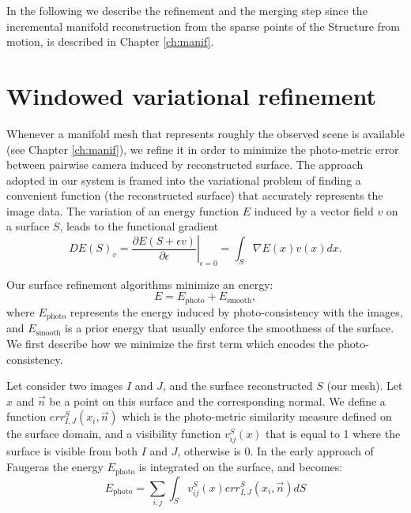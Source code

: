 In the following we describe the refinement and the merging step since the incremental manifold reconstruction from the sparse points of the Structure from motion, is described in Chapter \ref{ch:manif}.

\section{Windowed variational refinement}
\label{sec:Incremental_photoconsistent}
Whenever a manifold mesh that represents roughly the observed scene is available (see Chapter \ref{ch:manif}), we refine it in order to minimize the photo-metric error between pairwise camera induced by reconstructed surface. 
The approach adopted in our system is framed into the variational problem of finding a convenient function (the reconstructed surface) that  accurately represents the image data.
The variation of an energy function $E$ induced by a vector field $v$ on a surface $\mathit{S}$, leads to the functional gradient
\begin{equation}
\label{eq::calculus}
 DE(\mathit{S})_v = \left.\frac{\partial E(\mathit{S} + \epsilon v)}{\partial \epsilon} \right|_{\epsilon=0} = \int_{\mathit{S}} \nabla E(x)v(x) dx.
\end{equation}

Our surface refinement algorithms minimize an energy:
\begin{equation}
\label{eq:en}
E = E_{\textrm{photo}} + E_{\textrm{smooth}} ,
\end{equation}
where  $E_{\textrm{photo}}$ represents the energy induced by photo-consistency with the images, and $E_{\textrm{smooth}}$ is a prior energy that usually enforce the smoothness of the surface.  
We first describe how we minimize the first term which encodes the photo-consistency.

Let consider two images $I$ and $J$, and the surface reconstructed $\mathit{S}$ (our mesh). Let $x$ and $\overrightarrow{n}$ be a point on this surface and the corresponding normal. 
We define a function $err^S_{I, J}(x_i,\overrightarrow{n})$ which is the photo-metric similarity measure defined on the surface domain, and a visibility function $v^{\mathit{S}}_{ij}(x)$ that is equal to 1 where the surface is visible from both $I$ and $J$, otherwise is 0. 
In the early approach of Faugeras \etal \cite{faugeras2002variational} the energy $E_{\textrm{photo}}$ is integrated on the surface, and becomes:
\begin{equation}
 E_{\textrm{photo}} = \sum_{i,j}\int_{\mathit{S}} v^{\mathit{S}}_{ij}(x) err^S_{I,J}(x_i, \overrightarrow{n}) d\mathit{S}
\end{equation}


